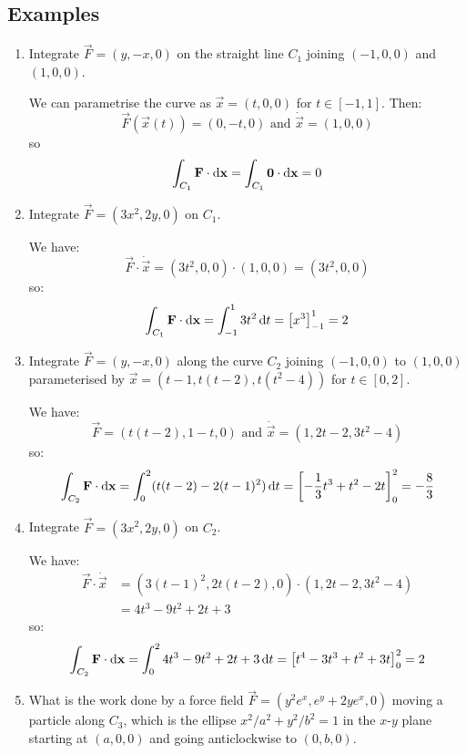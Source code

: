 \documentclass[../main.tex]{subfiles}
\begin{document}
\subsection{Examples}
\begin{example}
  \label{lineIntegralExamples}
  \begin{enumerate}
    \item Integrate $\vec{F} = (y, -x, 0)$ on the straight line $C_1$ joining $(-1, 0, 0)$ and $(1, 0, 0)$.

      We can parametrise the curve as $\vec{x} = (t, 0, 0)$ for $t \in [-1, 1]$.
      Then:
      \[
        \vec{F}(\vec{x}(t)) = (0, -t, 0) \text{ and } \dot{\vec{x}} = (1, 0, 0)
      \]
      so
      \[
        \int_{C_1} \vec{F} \cdot \d{\vec{x}} = \int_{C_1} \vec{0} \cdot \d{\vec{x}} = 0
      \]
    \item Integrate $\vec{F} = (3x^2, 2y, 0)$ on $C_1$.

      We have:
      \[
        \vec{F} \cdot \dot{\vec{x}} = (3t^2, 0, 0) \cdot (1, 0, 0) = (3t^2, 0, 0)
      \]
      so:
      \[
        \int_{C_1} \vec{F} \cdot \d{\vec{x}} = \int_{-1}^{1} 3t^2 \d{t} = \eval{x^3}{-1}{1} = 2
      \]
    \item Integrate $\vec{F} = (y, -x, 0)$ along the curve $C_2$ joining $(-1, 0, 0)$ to $(1, 0, 0)$ parameterised by $\vec{x} = (t - 1, t(t - 2), t(t^2 - 4))$ for $t \in [0, 2]$.

      We have:
      \[
        \vec{F} = (t(t - 2), 1 - t, 0) \text{ and } \dot{\vec{x}} = (1, 2t - 2, 3t^2 - 4)
      \]
      so:
      \[
        \int_{C_2} \vec{F} \cdot \d{\vec{x}} = \int_{0}^{2} (t(t - 2) - 2(t - 1)^2) \d{t} = \eval{-\frac{1}{3}t^3 + t^2 - 2t}{0}{2} = -\frac{8}{3}
      \]
    \item Integrate $\vec{F} = (3x^2, 2y, 0)$ on $C_2$.

      We have:
      \begin{align*}
        \vec{F} \cdot \dot{\vec{x}} &= (3(t - 1)^2, 2t(t - 2), 0) \cdot (1, 2t - 2, 3t^2 - 4) \\
                                    &= 4t^3 - 9t^2 + 2t + 3
      \end{align*}
      so:
      \[
        \int_{C_2} \vec{F} \cdot \d{\vec{x}} = \int_{0}^{2} 4t^3 - 9t^2 + 2t + 3 \d{t} = \eval{t^4 - 3t^3 + t^2 + 3t}{0}{2} = 2
      \]
    \item What is the work done by a force field $\vec{F} = (y^2 e^{x}, e^{y} + 2ye^{x}, 0)$ moving a particle along $C_3$, which is the ellipse $x^2/a^2 + y^2/b^2 = 1$ in the $x$-$y$ plane starting at $(a, 0, 0)$ and going anticlockwise to $(0, b, 0)$.


\end{enumerate}
\end{example}
\end{document}
